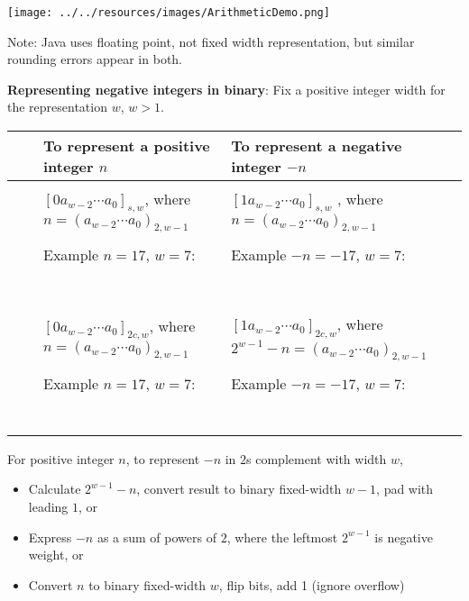 \documentclass[12pt, oneside]{article}
\begin{document}
\texttt{[image: ../../resources/images/ArithmeticDemo.png]}

Note: Java uses floating point, not fixed width representation, but similar rounding errors appear in both.
 \newpage


{\bf Representing negative integers in binary}: Fix a positive integer  width for the representation  $w$, $w >1$.

\begin{tabular}{|cc|p{3.4in}|p{3.7in}|}
\hline
& & To  represent a positive integer $n$ & To represent a negative integer $-n$\\
\hline
&& &  \\
&\parbox[t]{2mm}{} &
$[ 0a_{w-2} \cdots a_0]_{s,w}$, where $n =  (a_{w-2} \cdots a_0)_{2,w-1}$& 
$[1a_{w-2} \cdots a_0]_{s,w}$
, where $n =  (a_{w-2} \cdots a_0)_{2,w-1}$\\
&& & \\
&& Example $n=17$, $w=7$:  & Example $-n=-17$, $w=7$: \\
&& & \\
&& & \\
&& & \\
&& & \\
&& & \\
&& & \\
&& & \\
\hline
&&  &  \\
&\parbox[t]{2mm}{} &
$[0a_{w-2} \cdots a_0]_{2c,w}$, where $n =  (a_{w-2} \cdots a_0)_{2,w-1}$& $[1a_{w-2} \cdots a_0]_{2c,w}$, where $2^{w-1} - n =  (a_{w-2} \cdots a_0)_{2,w-1}$\\
&& & \\
&& Example $n=17$, $w=7$:  & Example $-n=-17$, $w=7$: \\
&& & \\
&& & \\
&& & \\
&& & \\
&& & \\
&& & \\
&& & \\
\hline
\end{tabular} 

For positive integer $n$, to represent $-n$ in 
$2$s complement with width $w$,
\begin{itemize}
    \item Calculate $2^{w-1} - n$, convert 
    result to binary fixed-width $w-1$, pad 
    with leading $1$, or
    \item Express $-n$ as a sum of powers of $2$, 
    where the leftmost $2^{w-1}$ is negative weight, or
    \item Convert $n$ to binary fixed-width $w$, 
    flip bits, add 1 (ignore overflow)
\end{itemize}
\end{document}
